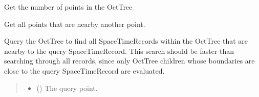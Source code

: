 \documentclass[letterpaper,10pt,english]{sphinxmanual}
\begin{document}
\begin{fulllineitems}
\begin{fulllineitems}
\end{fulllineitems}


\begin{fulllineitems}
\label{\detokenize{users_guide:GeoSpatialTools.octtree.OctTree.len}}
\pysigstartsignatures
\pysiglinewithargsret
{}
{}
{}
\pysigstopsignatures
\sphinxAtStartPar
Get the number of points in the OctTree
\begin{quote}\begin{description}
\sphinxAtStartPar
{}

\end{description}\end{quote}

\end{fulllineitems}


\begin{fulllineitems}
\label{\detokenize{users_guide:GeoSpatialTools.octtree.OctTree.nearby_points}}
\pysigstartsignatures
\pysiglinewithargsret
{}
{\sphinxparamcomma {}\sphinxparamcomma {}\sphinxparamcomma {}}
{}
\pysigstopsignatures
\sphinxAtStartPar
Get all points that are nearby another point.

\sphinxAtStartPar
Query the OctTree to find all SpaceTimeRecords within the OctTree that
are nearby to the query SpaceTimeRecord. This search should be faster
than searching through all records, since only OctTree children whose
boundaries are close to the query SpaceTimeRecord are evaluated.
\begin{quote}\begin{description}
\begin{itemize}
\item {} 
\sphinxAtStartPar
{} ({\hyperref[\detokenize{users_guide:GeoSpatialTools.octtree.SpaceTimeRecord}]{}}) \textendash{} The query point.


\end{itemize}
\end{description}
\end{quote}
\end{fulllineitems}
\end{fulllineitems}
\end{document}
